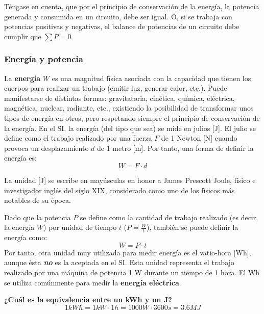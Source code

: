 	\begin{remark}
	    Téngase en cuenta, que por el principio de conservación de la energía, la potencia generada y consumida en un circuito, debe ser igual. O, si se trabaja con potencias positivas y negativas, el balance de potencias de un circuito debe cumplir que $\sum P=0$
	\end{remark}
	
	\subsubsection{Energía y potencia}
	
	La \textbf{energía} $W$ es una magnitud física asociada con la capacidad que tienen los cuerpos para realizar un trabajo (emitir luz, generar calor, etc.). Puede manifestarse de distintas formas: gravitatoria, cinética, química, eléctrica, magnética, nuclear, radiante, etc., existiendo la posibilidad de transformar unos tipos de energía en otros, pero respetando siempre el principio de conservación de la energía. En el SI, la energía (del tipo que sea) se mide en julios [J]. El julio se define como el trabajo realizado por una fuerza $F$ de 1 Newton [N] cuando provoca un desplazamiento $d$ de 1 metro [m]. Por tanto, una forma de definir la energía es:
	\begin{equation*}
		W=F\cdot d 
	\end{equation*}
	\begin{remark}
		La unidad [J] se escribe en mayúsculas en honor a James Prescott Joule, físico e investigador inglés del siglo XIX, considerado como uno de los físicos más notables de su época. 
	\end{remark}
	
	Dado que la potencia $P$ se define como la cantidad de trabajo realizado (es decir, la energía $W$) por unidad de tiempo $t$ ($P=\frac{W}{t}$), también se puede definir la energía como:
	\begin{equation*}\label{eq.Ept}
		W=P\cdot t
	\end{equation*}
	Por tanto, otra unidad muy utilizada para medir energía es el vatio-hora [Wh], aunque ésta \textbf{\emph{no}} es la aceptada en el SI. Esta unidad representa el trabajo realizado por una máquina de potencia 1 W durante un tiempo de 1 hora. El Wh se utiliza comúnmente para medir la \textbf{energía eléctrica}. 
	
	\vspace{4mm}
	\begin{example}
		\textbf{¿Cuál es la equivalencia entre un kWh y un J?}
		\begin{equation*}
		    1 kWh = 1 kW \cdot 1 h = 1000 W \cdot 3600 s = 3.6 MJ 
		\end{equation*}
	\end{example}
	
